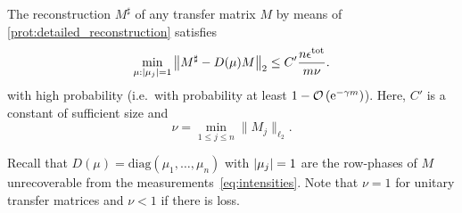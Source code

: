 \begin{corollary}
  \label{cor:noisy_performance_guarantee}
  The reconstruction ${M}^\sharp$ of any transfer matrix ${M}$ by means of \cref{prot:detailed_reconstruction} satisfies
    \[
      \min_{{\mu}: {\vert\mu_j\vert} = 1} \left\|  {M}^\sharp -  {D} ({\mu}) {M} \right\|_2
      \leq C' \frac{n \epsilon^\mathrm{tot}}{m \nu}.
      \label{eq:noisy_reconstruction_total_bound}
    \]
  with high probability (i.e.\ with probability at least $1 - {\mathcal{O}} \left( \mathrm{e}^{-\gamma m}\right)$).
  Here, $C'$ is a constant of sufficient size and
  \[
    \nu = \min_{1 \leq j \leq n} \| {M}_j \|_{\ell_2}.
    \label{eq:definition_normconst}
  \]
\end{corollary}
Recall that ${D}(\mu) = \mathrm{diag}(\mu_1, \ldots, \mu_n)$ with ${\vert\mu_j\vert} = 1$ are the row-phases of ${M}$ unrecoverable from the measurements~\eqref{eq:intensities}.
Note that $\nu = 1$ for unitary transfer matrices and $\nu < 1$ if there is loss.

